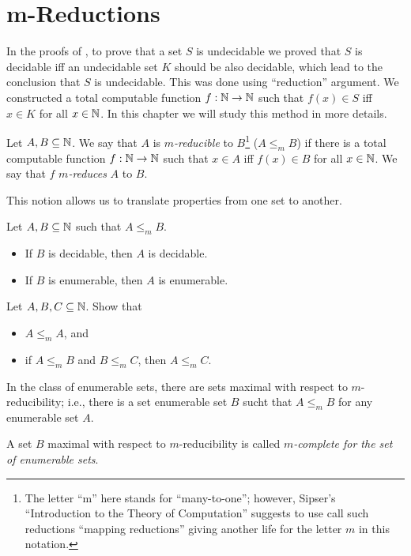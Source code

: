 \chapter{m-Reductions}
In the proofs of , to prove
that a set $S$ is undecidable we proved that $S$ is decidable iff an undecidable
set $K$ should be also decidable, which lead to the conclusion that $S$ is
undecidable. This was done using ``reduction'' argument. We constructed a total
computable function $f : {\mathbb{N}} \to {\mathbb{N}}$ such that $f(x) \in S$ iff $x \in K$ for all
$x \in {\mathbb{N}}$. In
this chapter we will study this method in more details.

\begin{definition}
  Let $A, B \subseteq {\mathbb{N}}$. We say that $A$ is \emph{$m$-reducible} to
  $B$\footnote{%
    The letter ``m'' here stands for ``many-to-one''; however, Sipser's
    ``Introduction to the Theory of Computation'' suggests to use call such
    reductions ``mapping reductions'' giving another life for the letter $m$ in
    this notation.
  }
  ($A \le_m B$) if there is a total computable function $f : {\mathbb{N}} \to {\mathbb{N}}$ such
  that $x \in A$ iff $f(x) \in B$ for all $x \in {\mathbb{N}}$. We say that $f$
  \emph{$m$-reduces} $A$ to $B$.
\end{definition}

This notion allows us to translate properties from one set to another.
\begin{theorem}
  Let $A, B \subseteq {\mathbb{N}}$ such that $A \le_m B$.
  \begin{itemize}
    \item If $B$ is decidable, then $A$ is decidable.
    \item If $B$ is enumerable, then $A$ is enumerable.
  \end{itemize}
\end{theorem}

\begin{exercise}
  Let $A, B, C \subseteq {\mathbb{N}}$. Show that
  \begin{itemize}
    \item $A \le_m A$, and 
    \item if $A \le_m B$ and $B \le_m C$, then $A \le_m C$.
  \end{itemize}
\end{exercise}

\begin{theorem}
  In the class of enumerable sets, there are sets maximal with respect to
  $m$-reducibility; i.e., there is a set enumerable set $B$ sucht that $A \le_m
  B$ for any enumerable set $A$.
\end{theorem}

\begin{definition}
  A set $B$ maximal with respect to $m$-reducibility is called
  \emph{$m$-complete for the set of enumerable sets}.
\end{definition}
